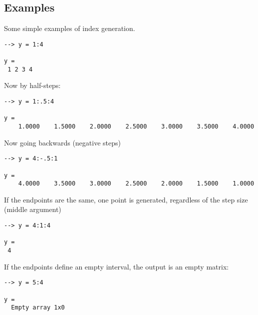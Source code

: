 \subsection{Examples}

Some simple examples of index generation.
\begin{verbatim}
--> y = 1:4

y = 
 1 2 3 4 
\end{verbatim}
Now by half-steps:
\begin{verbatim}
--> y = 1:.5:4

y = 
    1.0000    1.5000    2.0000    2.5000    3.0000    3.5000    4.0000 
\end{verbatim}
Now going backwards (negative steps)
\begin{verbatim}
--> y = 4:-.5:1

y = 
    4.0000    3.5000    3.0000    2.5000    2.0000    1.5000    1.0000 
\end{verbatim}
If the endpoints are the same, one point is generated, regardless of the step size (middle argument)
\begin{verbatim}
--> y = 4:1:4

y = 
 4 
\end{verbatim}
If the endpoints define an empty interval, the output is an empty matrix:
\begin{verbatim}
--> y = 5:4

y = 
  Empty array 1x0
\end{verbatim}
